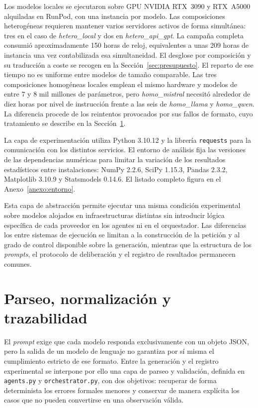 Los modelos locales se ejecutaron sobre GPU NVIDIA RTX~3090 y RTX~A5000 alquiladas en RunPod, con una instancia por modelo. Las composiciones heterogéneas requieren mantener varios servidores activos de forma simultánea: tres en el caso de \textit{hetero\_local} y dos en \textit{hetero\_api\_gpt}. La campaña completa consumió aproximadamente 150 horas de reloj, equivalentes a unas 209 horas de instancia una vez contabilizada esa simultaneidad. El desglose por composición y su traducción a coste se recogen en la Sección~\ref{sec:presupuesto}. El reparto de ese tiempo no es uniforme entre modelos de tamaño comparable. Las tres composiciones homogéneas locales emplean el mismo hardware y modelos de entre 7 y 8 mil millones de parámetros, pero \textit{homo\_mistral} necesitó alrededor de diez horas por nivel de instrucción frente a las seis de \textit{homo\_llama} y \textit{homo\_qwen}. La diferencia procede de los reintentos provocados por sus fallos de formato, cuyo tratamiento se describe en la Sección~\ref{sec:parseo_trazabilidad}.

La capa de experimentación utiliza Python 3.10.12 y la librería \texttt{requests} para la comunicación con los distintos servicios. El entorno de análisis fija las versiones de las dependencias numéricas para limitar la variación de los resultados estadísticos entre instalaciones: NumPy 2.2.6, SciPy 1.15.3, Pandas 2.3.2, Matplotlib 3.10.9 y Statsmodels 0.14.6. El listado completo figura en el Anexo~\ref{anexo:entorno}.

Esta capa de abstracción permite ejecutar una misma condición experimental sobre modelos alojados en infraestructuras distintas sin introducir lógica específica de cada proveedor en los agentes ni en el orquestador. Las diferencias los entre sistemas de ejecución se limitan a la construcción de la petición y al grado de control disponible sobre la generación, mientras que la estructura de los \textit{prompts}, el protocolo de deliberación y el registro de resultados permanecen comunes.

\section{Parseo, normalización y trazabilidad}
\label{sec:parseo_trazabilidad}

El \textit{prompt} exige que cada modelo responda exclusivamente con un objeto JSON, pero la salida de un modelo de lenguaje no garantiza por sí misma el cumplimiento estricto de ese formato. Entre la generación y el registro experimental se interpone por ello una capa de parseo y validación, definida en \texttt{agents.py} y \texttt{orchestrator.py}, con dos objetivos: recuperar de forma determinista los errores formales menores y conservar de manera explícita los casos que no pueden convertirse en una observación válida.


